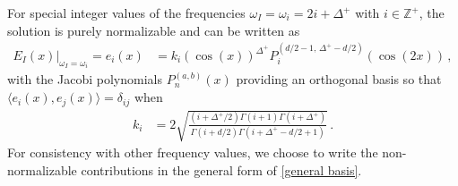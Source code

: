 \documentclass[letterpaper,11pt]{article}
\newcommand{\oi}{\omega_i}
\begin{document}
For special integer values of the frequencies $\omega_I = \omega_i = 2i + \Delta^+$ with $i \in \mathbb{Z}^+$, the solution is purely normalizable 
and can be written as
\begin{align}
\label{normal basis}
E_I (x)\Big|_{\omega_I = \oi} = e_i(x) &= k_i \left( \cos(x) \right)^{\Delta^+} P_{i}^{(d/2 - 1, \, \Delta^+ - d/2)} \left( \cos (2x) \right) \, ,
\end{align}
with the Jacobi polynomials $P^{(a,b)}_n (x)$ providing an orthogonal basis so that ${\langle e_i (x), e_j(x) \rangle = \delta_{i j}}$ when
\begin{align}
k_i &= 2 \sqrt{\frac{(i + \Delta^+ /2) \Gamma(i+1) \Gamma(i+\Delta^+)}{\Gamma(i+d/2) \Gamma(i + \Delta^+ - d/2 + 1)}} \, .
\end{align}
For consistency with other frequency values, we choose to write the non-normalizable contributions 
in the general form of \eqref{general basis}. 
\end{document}

